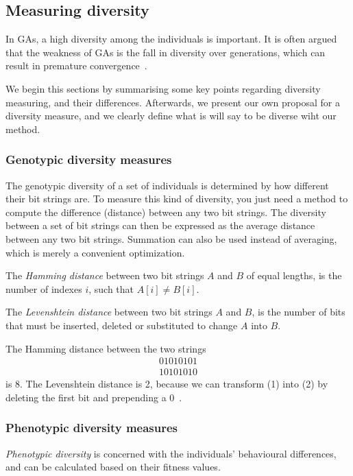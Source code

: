 \subsection{Measuring diversity}
In GAs, a high diversity among the individuals is important. It is often argued that the weakness of GAs is the fall in diversity over generations, which can result in premature convergence~\cite{diaz2007empirical, 1266373,Zitzler00comparisonof}.

We begin this sections by summarising some key points regarding diversity measuring, and their differences. Afterwards, we present our own proposal for a diversity measure, and we clearly define what is will say to be diverse wiht our method. 

\subsubsection{Genotypic diversity measures}
The genotypic diversity of a set of individuals is determined by how different their bit strings are.
To measure this kind of diversity, you just need a method to compute the difference (distance) between any two bit strings.
The diversity between a set of bit strings can then be expressed as the average distance between any two bit strings.
Summation can also be used instead of averaging, which is merely a convenient optimization.

The \emph{Hamming distance} between two bit strings $A$ and $B$ of equal lengths, is the number of indexes $i$, such that $A[i] \neq B[i]$.

The \emph{Levenshtein distance} between two bit strings $A$ and $B$, is the number of bits that must be inserted, deleted or substituted to change $A$ into $B$.

The Hamming distance between the two strings
%
\begin{align}
    01010101 \\
    10101010
\end{align}
%
is 8. The Levenshtein distance is 2, because we can transform (1) into (2) by deleting the first bit and prepending a $0$~\cite{1250187}.

\subsubsection{Phenotypic diversity measures}
\emph{Phenotypic diversity} is concerned with the individuals' behavioural differences, and can be calculated based on their fitness values.

